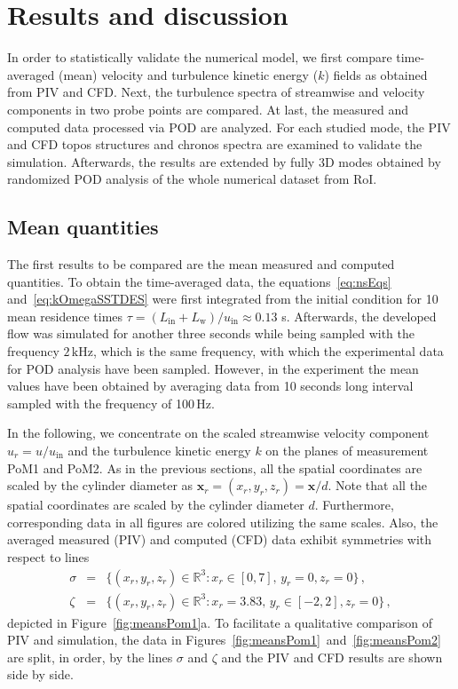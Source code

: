 \section{Results and discussion}
\label{sec:resultsAndDisc}

{In order to statistically validate the numerical model, we first compare time-averaged (mean) velocity and turbulence kinetic energy ($k$) fields as obtained from PIV and CFD.} Next, the turbulence spectra of streamwise and  velocity components in two probe points are compared. At last, the measured and computed data {processed via POD} are analyzed. For each studied mode, the PIV and CFD topos structures and chronos spectra are examined to validate the simulation. {Afterwards, } the results are extended by fully 3D modes obtained by {randomized} POD analysis of the whole numerical dataset from RoI.

\subsection{Mean quantities}
\label{sub:meanData}
The first results to be compared are the mean measured and computed quantities. To obtain the time-averaged data, the equations~\eqref{eq:nsEqs} and~\eqref{eq:kOmegaSSTDES} were first integrated from the initial condition for 10 mean residence times $\tau = (L_{\mathrm{in}} + L_{\mathrm{w}})/u_{\mathrm{in}} \approx {0.13}$ s. Afterwards, the developed flow was simulated for another three seconds while being sampled with the frequency $2\,\mathrm{kHz}$, which is the same frequency, with which the experimental data for POD analysis {have} been sampled. However, in the experiment the mean values {have} been obtained by averaging data from 10 seconds long interval sampled with {the} frequency {of} 100\,Hz.

In the following, we concentrate on the scaled streamwise velocity component $u_r=u/u_{\mathrm{in}}$ and the turbulence kinetic energy $k$ on the planes of measurement PoM1 and PoM2. As in the previous sections, all the spatial coordinates are scaled by the cylinder diameter as $\bm{x}_{r} = (x_{r},y_{r},z_{r}) = \bm{x}/d$. Note that all the spatial coordinates are scaled by the cylinder diameter $d$. Furthermore, corresponding data in all figures are colored utilizing the same scales. {Also, the} {averaged} measured (PIV) and computed (CFD) {data exhibit symmetries with respect to lines}
\begin{equation}
\label{eq:sigmaZeta}
    \begin{array}{rcl}
        \displaystyle \sigma &=& \displaystyle \{(x_{r},y_{r},z_{r})\in\mathbb{R}^{3}:x_{r}\in [0,7],\,y_{r} = 0,z_{r}=0\}\,,\\[0.2cm]
        \displaystyle \zeta  &=& \displaystyle \{(x_{r},y_{r},z_{r})\in\mathbb{R}^{3}:x_{r} = 3.83,\,y_{r}\in [-2,2],z_{r}=0\}\,,
    \end{array}
\end{equation}
depicted in Figure~\ref{fig:meansPom1}a. {To facilitate a qualitative comparison of PIV and simulation, the data in Figures~\ref{fig:meansPom1}~and~\ref{fig:meansPom2} are split, in order, by the lines $\sigma$ and $\zeta$ and the PIV and CFD results are shown side by side.}


